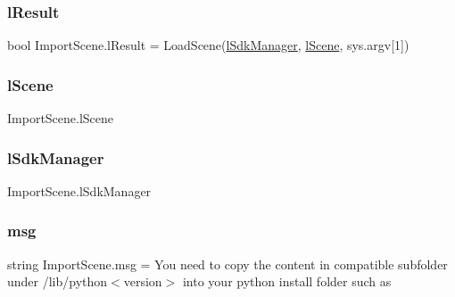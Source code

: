 \subsubsection{\texorpdfstring{l\+Result}{lResult}}
{\footnotesize\ttfamily bool Import\+Scene.\+l\+Result = Load\+Scene(\hyperlink{namespace_import_scene_a5e1fef1154e08e971acbd290b0736b24}{l\+Sdk\+Manager}, \hyperlink{namespace_import_scene_a59462472b96f3f51b1cee7797a376ed8}{l\+Scene}, sys.\+argv\mbox{[}1\mbox{]})}

\mbox{\label{namespace_import_scene_a59462472b96f3f51b1cee7797a376ed8}} 
\subsubsection{\texorpdfstring{l\+Scene}{lScene}}
{\footnotesize\ttfamily Import\+Scene.\+l\+Scene}

\mbox{\label{namespace_import_scene_a5e1fef1154e08e971acbd290b0736b24}} 
\subsubsection{\texorpdfstring{l\+Sdk\+Manager}{lSdkManager}}
{\footnotesize\ttfamily Import\+Scene.\+l\+Sdk\+Manager}

\mbox{\label{namespace_import_scene_a95d1ca9cb3235b20a53cfd5d728d5f8f}} 
\subsubsection{\texorpdfstring{msg}{msg}}
{\footnotesize\ttfamily string Import\+Scene.\+msg = \textquotesingle{}You need to copy the content in compatible subfolder under /lib/python$<$version$>$ into your python install folder such as \textquotesingle{}}

